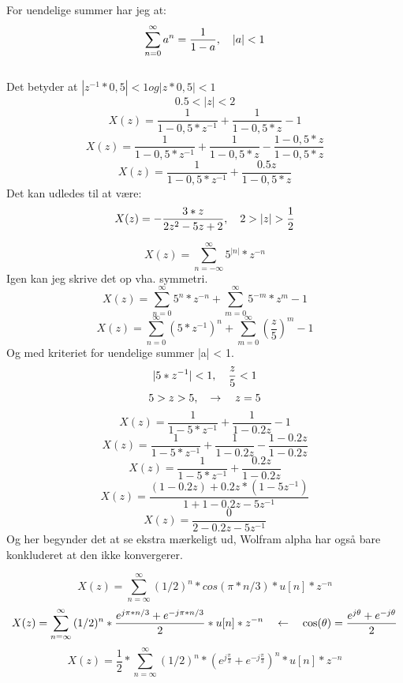\begin{Opgaver}
\begin{kapitel}
\begin{Opgave}
\begin{UnderOpgave}[\text{$x[n] = \frac{1}{2}^{|n|}$}]
                For uendelige summer har jeg at: 
                \[\sum_{n=0}^{\infty}{a^n} = \frac{1}{1 - a}, \quad |a| < 1\]
                \\
                Det betyder at $|z^{-1} * 0,5| < 1 og |z * 0,5| < 1$
                \[0.5 < |z| < 2\]
                \[X(z) = \frac{1}{1 - 0,5*z^{-1}} + \frac{1}{1 - 0,5*z} - 1\]
                \[X(z) = \frac{1}{1 - 0,5*z^{-1}} + \frac{1}{1 - 0,5*z} - \frac{1 - 0,5*z}{1 - 0,5*z}\]
                \[X(z) = \frac{1}{1 - 0,5*z^{-1}} + \frac{0.5z}{1 - 0,5*z}\]
                Det kan udledes til at være: 
                \[X(z) = -\frac{3*z}{2z^2 -5z+2},\quad 2 > |z| > \frac{1}{2}\]
            \end{UnderOpgave}
            \begin{UnderOpgave}[\text{$x[n] = 5^{|n|}$}]
                \[X(z) = \sum_{n=-\infty}^{\infty}{5^{|n|} * z^{-n}}\]
                Igen kan jeg skrive det op vha. symmetri. \\
                \[X(z) = \sum_{n=0}^{\infty}{5^{n} * z^{-n}} + \sum_{m=0}^{\infty}{5^{-m} * z^{m}} - 1\]
                \[X(z) = \sum_{n=0}^{\infty}{(5*z^{-1})^{n}} + \sum_{m=0}^{\infty}{(\frac{z}{5})^m} - 1\]
                Og med kriteriet for uendelige summer |a| < 1. \\
                \[|5*z^{-1}| < 1, \quad \frac{z}{5} < 1\]
                \[5 > z > 5, \quad\rightarrow\quad z = 5\]
                \[X(z) = \frac{1}{1 - 5*z^{-1}} + \frac{1}{1 - 0.2z} - 1\]
                \[X(z) = \frac{1}{1 - 5*z^{-1}} + \frac{1}{1 - 0.2z} - \frac{1 - 0.2z}{1 - 0.2z}\]
                \[X(z) = \frac{1}{1 - 5*z^{-1}} + \frac{0.2z}{1 - 0.2z}\]
                \[X(z) = \frac{(1 - 0.2z) + 0.2z*(1 - 5z^{-1})}{1+1 - 0.2z - 5z^{-1}}\]
                \[X(z) = \frac{0}{2 - 0.2z - 5z^{-1}}\]
                Og her begynder det at se ekstra mærkeligt ud, Wolfram alpha har også bare konkluderet at den ikke konvergerer. 
            \end{UnderOpgave}
            \begin{UnderOpgave}[\text{$x[n] = (1/2)^n * cos(\pi * n/3)*u[n]$}, forkert]
                \[X(z) = \sum_{n=\infty}^{\infty}{(1/2)^n * cos(\pi * n/3)*u[n] * z^{-n}}\]
                \[X(z) = \sum_{n=\infty}^{\infty}{(1/2)^n * \frac{e^{j\pi * n/3} + e^{-j\pi * n/3}}{2}*u[n] * z^{-n}} \quad\leftarrow\quad \cos(\theta) = \frac{e^{j\theta} + e^{-j\theta}}{2}\]
                \[X(z) = \frac{1}{2} * \sum_{n=\infty}^{\infty}{(1/2)^n * (e^{j\frac{\pi}{3}} + e^{-j\frac{\pi}{3}})^n*u[n] * z^{-n}}\]

\end{UnderOpgave}
\end{Opgave}
\end{kapitel}
\end{Opgaver}
